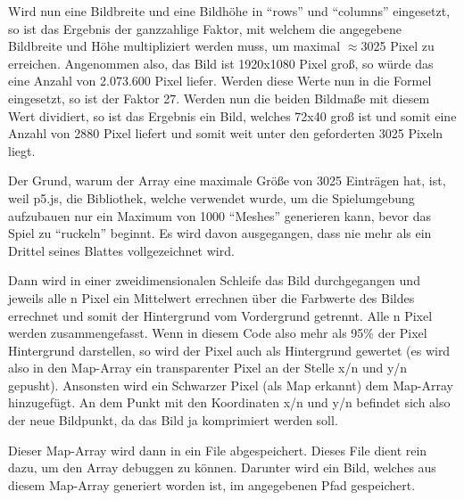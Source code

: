 Wird nun eine Bildbreite und eine Bildhöhe in ``rows'' und ``columns'' eingesetzt, so ist das Ergebnis der ganzzahlige Faktor, mit welchem die angegebene Bildbreite und Höhe multipliziert werden muss, um maximal \(\approx\)3025 Pixel zu erreichen.
Angenommen also, das Bild ist 1920x1080 Pixel groß, so würde das eine Anzahl von 2.073.600 Pixel liefer. Werden diese Werte nun in die Formel eingesetzt, so ist der Faktor 27. Werden nun die beiden Bildmaße mit diesem Wert dividiert, so ist das Ergebnis ein Bild, welches 72x40 groß ist und somit eine Anzahl von 2880 Pixel liefert und somit weit unter den geforderten 3025 Pixeln liegt.

Der Grund, warum der Array eine maximale Größe von 3025 Einträgen hat, ist, weil p5.js, die Bibliothek, welche verwendet wurde, um die Spielumgebung aufzubauen nur ein Maximum von 1000 ``Meshes'' generieren kann, bevor das Spiel zu ``ruckeln'' beginnt. Es wird davon ausgegangen, dass nie mehr als ein Drittel seines Blattes vollgezeichnet wird.

Dann wird in einer zweidimensionalen Schleife das Bild durchgegangen und jeweils alle n Pixel ein Mittelwert errechnen über die Farbwerte des Bildes errechnet und somit der Hintergrund vom Vordergrund getrennt. Alle n Pixel werden zusammengefasst. Wenn in diesem Code also mehr als 95\% der Pixel Hintergrund darstellen, so wird der Pixel auch als Hintergrund gewertet (es wird also in den Map-Array ein transparenter Pixel an der Stelle x/n und y/n gepusht). Ansonsten wird ein Schwarzer Pixel (als Map erkannt) dem Map-Array hinzugefügt. An dem Punkt mit den Koordinaten x/n und y/n befindet sich also der neue Bildpunkt, da das Bild ja komprimiert werden soll.

Dieser Map-Array wird dann in ein File abgespeichert. Dieses File dient rein dazu, um den Array debuggen zu können. Darunter wird ein Bild, welches aus diesem Map-Array generiert worden ist, im angegebenen Pfad gespeichert.

